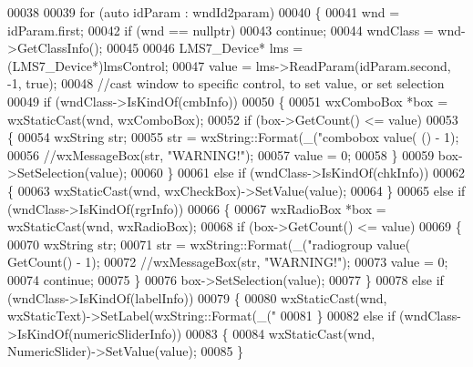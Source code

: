\begin{DoxyCode}
00038 
00039     \textcolor{keywordflow}{for} (\textcolor{keyword}{auto} idParam : wndId2param)
00040     \{
00041         wnd = idParam.first;
00042         \textcolor{keywordflow}{if} (wnd == \textcolor{keyword}{nullptr})
00043             \textcolor{keywordflow}{continue};
00044         wndClass = wnd->GetClassInfo();
00045 
00046         LMS7_Device* lms = (LMS7_Device*)lmsControl;
00047         value = lms->ReadParam(idParam.second, -1, \textcolor{keyword}{true});
00048         \textcolor{comment}{//cast window to specific control, to set value, or set selection}
00049         \textcolor{keywordflow}{if} (wndClass->IsKindOf(cmbInfo))
00050         \{
00051             wxComboBox *box = wxStaticCast(wnd, wxComboBox);
00052             \textcolor{keywordflow}{if} (box->GetCount() <= value)
00053             \{
00054                 wxString str;
00055                 str = wxString::Format(\_(\textcolor{stringliteral}{"combobox value(%
      () - 1);
00056                 \textcolor{comment}{//wxMessageBox(str, "WARNING!");}
00057                 value = 0;
00058             \}
00059             box->SetSelection(value);
00060         \}
00061         \textcolor{keywordflow}{else} \textcolor{keywordflow}{if} (wndClass->IsKindOf(chkInfo))
00062         \{
00063             wxStaticCast(wnd, wxCheckBox)->SetValue(value);
00064         \}
00065         \textcolor{keywordflow}{else} \textcolor{keywordflow}{if} (wndClass->IsKindOf(rgrInfo))
00066         \{
00067             wxRadioBox *box = wxStaticCast(wnd, wxRadioBox);
00068             \textcolor{keywordflow}{if} (box->GetCount() <= value)
00069             \{
00070                 wxString str;
00071                 str = wxString::Format(\_(\textcolor{stringliteral}{"radiogroup value(%
      GetCount() - 1);
00072                 \textcolor{comment}{//wxMessageBox(str, "WARNING!");}
00073                 value = 0;
00074                 \textcolor{keywordflow}{continue};
00075             \}
00076             box->SetSelection(value);
00077         \}
00078         \textcolor{keywordflow}{else} \textcolor{keywordflow}{if} (wndClass->IsKindOf(labelInfo))
00079         \{
00080             wxStaticCast(wnd, wxStaticText)->SetLabel(wxString::Format(\_(\textcolor{stringliteral}{"%
00081         \}
00082         \textcolor{keywordflow}{else} \textcolor{keywordflow}{if} (wndClass->IsKindOf(numericSliderInfo))
00083         \{
00084             wxStaticCast(wnd, NumericSlider)->SetValue(value);
00085         \}
}}}
\end{DoxyCode}
